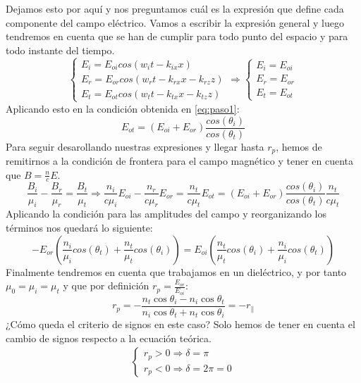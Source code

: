 \documentclass[11pt]{article}
\begin{document}
    \noindent Dejamos esto por aquí y nos preguntamos cuál es la expresión que define cada componente del campo eléctrico. Vamos a escribir la expresión general y luego tendremos en cuenta que se han de cumplir para todo punto del espacio y para todo instante del tiempo.
    \begin{equation*}
    \left\{ \begin{array}{lr} E_i = E_{oi}cos(w_it-k_{ix}x) \\ E_r = E_{or}cos(w_rt-k_{rx}x-k_{rz}z)\\
    E_t = E_{ot}cos(w_tt-k_{tx}x-k_{tz}z)
    \end{array} \right. \Longrightarrow \left\{ \begin{array}{lr} E_i = E_{oi}\\ E_r = E_{or}\\
    E_t = E_{ot} \end{array} \right.
    \end{equation*}
    \noindent Aplicando esto en la condición obtenida en \ref{eq:paso1}:
    \begin{equation}
        E_{ot} = (E_{oi}+E_{or})\frac{cos(\theta_i)}{cos(\theta_t)}
    \end{equation} \label{eq:paso2}
    \noindent Para seguir desarollando nuestras expresiones y llegar hasta $r_p$, hemos de remitirnos a la condición de frontera para el campo magnético y tener en cuenta que $B = \frac{n}{c}E$.
    \begin{equation}
        \frac{B_i}{\mu_i} - \frac{B_r}{\mu_r} = \frac{B_t}{\mu_t} \Longrightarrow \frac{n_i}{c\mu_i}E_{oi} - \frac{n_r}{c\mu_r}E_{or} = \frac{n_t}{c\mu_t}E_{ot} = (E_{oi}+E_{or})\frac{cos(\theta_i)}{cos(\theta_t)}\frac{n_t}{c\mu_t}
    \end{equation}
    \noindent Aplicando la condición para las amplitudes del campo y reorganizando los términos nos quedará lo siguiente:
    \begin{equation}
        -E_{or}\left(\frac{n_i}{\mu_i}cos(\theta_t)+\frac{n_t}{\mu_t}cos(\theta_i)\right) = E_{oi}\left(\frac{n_t}{\mu_t}cos(\theta_i)+\frac{n_i}{\mu_i}cos(\theta_t)\right)
    \end{equation}
    \noindent Finalmente tendremos en cuenta que trabajamos en un dieléctrico, y por tanto $\mu_0 = \mu_i = \mu_t$ y que por definición $r_p = \frac{E_{or}}{E_{oi}}$:
    \begin{equation}
        r_p=-{\frac {n_{t}\cos \theta _{i}-n_{i}\cos \theta _{t}}{n_{i}\cos \theta _{t}+n_{t}\cos \theta _{i}}} = -r_\parallel
    \end{equation}
    \noindent ¿Cómo queda el criterio de signos en este caso? Solo hemos de tener en cuenta el cambio de signos respecto a la ecuación teórica.
    \begin{equation}
        \begin{split}
            \left\{ \begin{array}{lr} r_p > 0 \Longrightarrow \delta = \pi\\ r_p < 0 \Longrightarrow \delta = 2\pi = 0 \end{array} \right. 
        \end{split}
    \end{equation}
    \newpage 
\end{document}
